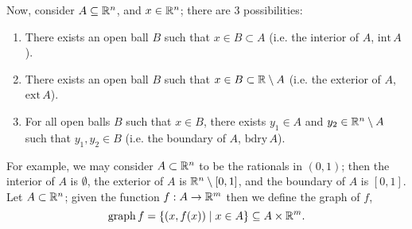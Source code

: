 Now, consider $A \subseteq \mathbb R^n$, and $x \in \mathbb R^n$; there are $3$ possibilities:
\begin{enumerate}
    \item There exists an open ball $B$ such that $x \in B \subset A$ (i.e. the interior of $A$, $\mathrm{int} \, A$).
    \item There exists an open ball $B$ such that $x \in B \subset \mathbb R \setminus A$ (i.e. the exterior of $A$, $\mathrm{ext} \, A$).
    \item For all open balls $B$ such that $x \in B$, there exists $y_1 \in A$ and $y_2 \in \mathbb R^n \setminus A$ such that $y_1, y_2 \in B$ (i.e. the boundary of $A$, $\mathrm{bdry} \, A$).
\end{enumerate}
For example, we may consider $A \subset \mathbb R^n$ to be the rationals in $(0, 1)$; then the interior of $A$ is $\emptyset$, the exterior of $A$ is $\mathbb R^n \setminus [0, 1]$, and the boundary of $A$ is $[0, 1]$.
\medskip\newline
Let $A \subset \mathbb R^n$; given the function $f : A \to \mathbb R^m$ then we define the graph of $f$,
\[ \mathrm{graph} \, f = \{(x, f(x)) \mid x \in A\} \subseteq A \times \mathbb R^m. \]
